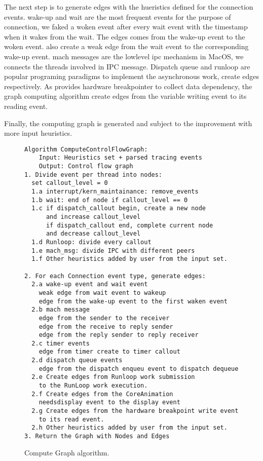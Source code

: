 The next step is to generate edges with the hueristics defined for the
connection events. wake-up and wait are the most frequent events for the purpose
of connection, we faked a woken event after every wait event with the timestamp
when it wakes from the wait. The edges comes from the wake-up event to the woken
event. \xxx also create a weak edge from the wait event to the corresponding
wake-up event. mach messages are the lowlevel ipc mechanism in MacOS, we
connects the threads involved in IPC message. Dispatch queue and runloop are
popular programing paradigms to implement the asynchronous work, \xxx create
edges respectively. As \xxx provides hardware breakpointer to collect data
dependency, the graph computing algorithm create edges from the variable writing
event to its reading event.

Finally, the computing graph is generated and subject to the improvement with
more input heuristics.

\begin{figure}[tb]
\footnotesize\begin{verbatim}
Algorithm ComputeControlFlowGraph:
    Input: Heuristics set + parsed tracing events
    Output: Control flow graph
1. Divide event per thread into nodes:
  set callout_level = 0
  1.a interrupt/kern_maintainance: remove_events
  1.b wait: end of node if callout_level == 0
  1.c if dispatch_callout begin, create a new node
      and increase callout_level
      if dispatch_callout end, complete current node
      and decrease callout_level
  1.d Runloop: divide every callout
  1.e mach_msg: divide IPC with different peers
  1.f Other heuristics added by user from the input set.

2. For each Connection event type, generate edges:
  2.a wake-up event and wait event
    weak edge from wait event to wakeup
    edge from the wake-up event to the first waken event
  2.b mach message
    edge from the sender to the receiver
    edge from the receive to reply sender
    edge from the reply sender to reply receiver
  2.c timer events
    edge from timer create to timer callout
  2.d dispatch queue events
    edge from the dispatch enqueu event to dispatch dequeue
  2.e Create edges from Runloop work submission
    to the RunLoop work execution.
  2.f Create edges from the CoreAnimation
    needsdisplay event to the display event
  2.g Create edges from the hardware breakpoint write event
    to its read event.
  2.h Other heuristics added by user from the input set.
3. Return the Graph with Nodes and Edges
\end{verbatim}
    \caption{\xxx Compute Graph algorithm.}
    \label{fig:alg-graphcomputing}
\end{figure}

